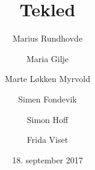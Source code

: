 
\titlepage
\title{Tekled}
\author{Marius Rundhovde \and Maria Gilje \and Marte Løkken Myrvold \and Simen Fondevik \and Simon Hoff \and Frida Viset}
\date{18. september 2017}
\maketitle

